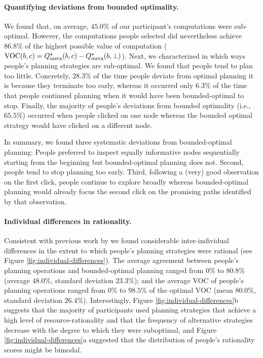 \paragraph{Quantifying deviations from bounded optimality.}  We found that, on average, $45.0\%$ of our participant's computations were sub-optimal. However, the computations people selected did nevertheless achieve $86.8\%$ of the highest possible value of computation ($\text{VOC}(b,c)=Q_{\text{meta}}^\star(b,c) - Q_{\text{meta}}^\star(b,\bot)$).
Next, we characterized in which ways people's planning strategies are sub-optimal. We found that people tend to plan too little. Concretely, $28.3\%$ of the time people deviate from optimal planning it is  because they terminate too early, whereas it occurred only $6.3\%$ of the time that people continued planning when it would have been bounded-optimal to stop. Finally, the majority of people's deviations from bounded optimality (i.e., $65.5\%$) occurred when people clicked on one node whereas the bounded optimal strategy would have clicked on a different node. 

In summary, we found three systematic deviations from bounded-optimal planning: People preferred to inspect equally informative nodes sequentially starting from the beginning but bounded-optimal planning does not. Second, people tend to stop planning too early. Third, following a (very) good observation on the first click, people continue to explore broadly whereas bounded-optimal planning would already focus the second click on the promising paths identified by that observation.

\paragraph{Individual differences in rationality.} Consistent with previous work by \cite{Stanovich1998} we found considerable inter-individual differences in the extent to which people's planning strategies were rational (see Figure \ref{fig:individual-differences}). The average agreement between people's planning operations and bounded-optimal planning ranged from $0\%$ to $80.8\%$ (average $48.0\%$, standard deviation $23.3\%$); and the average VOC of people's planning operations ranged from $0$\% to $98.5$\% of the optimal VOC (mean $80.0$\%, standard deviation $26.4$\%). Interestingly, Figure \ref{fig:individual-differences}b suggests that the majority of participants used planning strategies that achieve a high level of resource-rationality and that the frequency of alternative strategies decrease with the degree to which they were suboptimal, and Figure \ref{fig:individual-differences}a suggested that the distribution of people's rationality scores might be bimodal.

